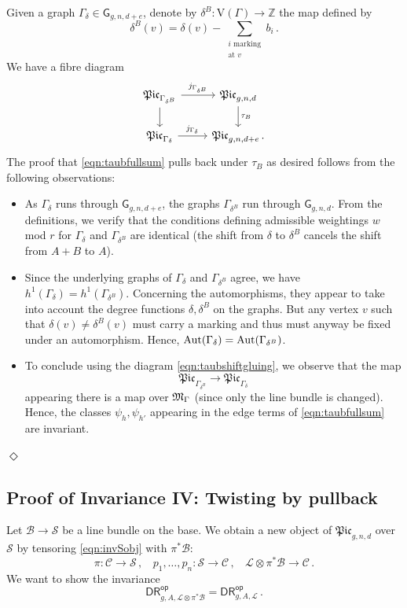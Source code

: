 \documentclass[a4paper,12pt]{article} %
\def\qed{{\hfill $\Diamond$}}
\def\Aut{{\rm Aut}}
\def\V{\mathrm{V}}
\def\G{\mathsf{G}}
\theoremstyle{definition}
\theoremstyle{plain}%
\newcommand{\Picabs}{\mathfrak{Pic}}
\newcommand{\invnrII}{IV}
\begin{document}
Given a graph $\Gamma_\delta \in \G_{g,n,d+e}$, denote by $\delta^B : \V(\Gamma) \to \mathbb{Z}$ the map defined by
\[\delta^B(v) = \delta(v) - \sum_{\substack{i\text{ marking}\\\text{at }v}}b_i\, .\]
We have a fibre diagram
\begin{equation} \label{eqn:taubshiftgluing}
\begin{tikzcd}
\Picabs_{\Gamma_{\delta^B}} \arrow[r,"j_{\Gamma_{\delta^B}}"] \arrow[d] & \Picabs_{g,n,d} \arrow[d,"\tau_B"]\\
\Picabs_{\Gamma_{\delta}} \arrow[r,"j_{\Gamma_{\delta}}"] & \Picabs_{g,n,d+e}\, .
\end{tikzcd}    
\end{equation}
The proof that \eqref{eqn:taubfullsum} pulls back under  $\tau_B$ as desired follows from the following observations:
\begin{itemize}
    \item As $\Gamma_\delta$ runs through $\G_{g,n,d+e}$, the graphs $\Gamma_{\delta^B}$ run through $\G_{g,n,d}$. From the definitions, we verify that the conditions defining admissible weightings $w$ mod $r$ for $\Gamma_\delta$ and $\Gamma_{\delta^B}$ are identical (the shift from $\delta$ to $\delta^B$ cancels the shift from $A+B$ to $A$). 
    \item Since the underlying graphs of $\Gamma_\delta$ and $\Gamma_{\delta^B}$ agree, we have $h^1(\Gamma_\delta) = h^1(\Gamma_{\delta^B})$. Concerning the automorphisms,
    they appear to take into account the degree functions $\delta, \delta^B$ on the graphs. But any vertex $v$ such that $\delta(v) \neq \delta^B(v)$ must carry a marking and thus must anyway be fixed under an automorphism. Hence, $\Aut(\Gamma_\delta) = \Aut(\Gamma_{\delta^B})$.
    \item To conclude using the diagram \eqref{eqn:taubshiftgluing}, we observe that the map $$\Picabs_{\Gamma_{\delta^B}} \to \Picabs_{\Gamma_\delta}$$ appearing there is a map over $\frak M_{\Gamma}$ (since only the line bundle is changed). Hence, the 
    classes $\psi_h, \psi_{h'}$ appearing in the edge terms of \eqref{eqn:taubfullsum} are invariant.
\end{itemize}
\qed

\subsection{Proof of Invariance \invnrII{}: {\rm Twisting by pullback}}
Let $\mathcal{B} \rightarrow \mathcal{S}$ be a line bundle on the
base. We obtain a new object of $\Picabs_{g,n,d}$ over $\mathcal{S}$ by tensoring \eqref{eqn:invSobj} with $\pi^*\mathcal{B}$:
\begin{equation}
\label{eqn:invII}    
\pi:\mathcal{C} \rightarrow \mathcal{S}\, , \ \ \ \ p_1,\ldots,p_n: \mathcal{S} \rightarrow \mathcal{C}\, , \ \ \ \
\mathcal{L}\otimes \pi^*\mathcal{B} \rightarrow \mathcal{C}\, .
\end{equation}
We want to show the invariance
$$\mathsf{DR}^{\mathsf{op}}_{g,A, \mathcal{L}\otimes\pi^*\mathcal{B}}
=\mathsf{DR}^{\mathsf{op}}_{g,A, \mathcal{L}}
\, . $$
\end{document}
